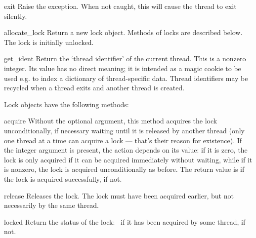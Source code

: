 \begin{funcdesc}{exit}{}
Raise the  exception.  When not caught, this
will cause the thread to exit silently.
\end{funcdesc}


\begin{funcdesc}{allocate_lock}{}
Return a new lock object.  Methods of locks are described below.  The
lock is initially unlocked.
\end{funcdesc}

\begin{funcdesc}{get_ident}{}
Return the `thread identifier' of the current thread.  This is a
nonzero integer.  Its value has no direct meaning; it is intended as a
magic cookie to be used e.g. to index a dictionary of thread-specific
data.  Thread identifiers may be recycled when a thread exits and
another thread is created.
\end{funcdesc}


Lock objects have the following methods:

\begin{methoddesc}[lock]{acquire}{}
Without the optional argument, this method acquires the lock
unconditionally, if necessary waiting until it is released by another
thread (only one thread at a time can acquire a lock --- that's their
reason for existence).  If the integer
 argument is present, the action depends on its
value: if it is zero, the lock is only acquired if it can be acquired
immediately without waiting, while if it is nonzero, the lock is
acquired unconditionally as before.  The
return value is  if the lock is acquired successfully,
 if not.
\end{methoddesc}

\begin{methoddesc}[lock]{release}{}
Releases the lock.  The lock must have been acquired earlier, but not
necessarily by the same thread.
\end{methoddesc}

\begin{methoddesc}[lock]{locked}{}
Return the status of the lock:\  if it has been acquired by
some thread,  if not.
\end{methoddesc}

